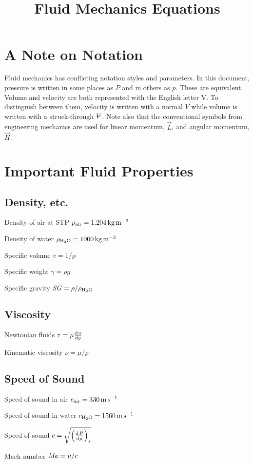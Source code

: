 \documentclass{article}
\title{Fluid Mechanics Equations}
\begin{document}


\section*{A Note on Notation}

Fluid mechanics has conflicting notation styles and parameters.  In this document, pressure is
written in some places as $P$ and in others as $p$. These are equivalent.  Volume and velocity are
both represented with the English letter V.  To distinguish between them, velocity is written with a
normal $V$ while volume is written with a struck-through $\volsym$.  Note also that the conventional
symbols from engineering mechanics are used for linear momentum, $\vec{L}$, and angular momentum,
$\vec{H}$.

\section{Important Fluid Properties}

\subsection{Density, etc.}
\begin{description*}
\item[Density of air at STP]
  \(\rho_{\mathrm{air}} = \SI{1.204}{\kilo\gram\per\cubic\meter}\)
\item[Density of water]
  \(\rho_{\mathrm{H_2O}} = \SI{1000}{\kilo\gram\per\cubic\meter}\)
\item[Specific volume]
  \(v = 1/\rho\)
\item[Specific weight]
  \(\gamma = \rho g\)
\item[Specific gravity]
  \(\mathord{\mathit{SG}} = \rho / \rho_{\mathrm{H_2O}}\)
\end{description*}

\subsection{Viscosity}
\begin{description*}
\item[Newtonian fluids]
  \(\tau = \mu \od{u}{y}\)
\item[Kinematic viscosity]
  \(\nu = \mu / \rho\)
\end{description*}

\subsection{Speed of Sound}
\begin{description*}
\item[Speed of sound in air]
  \(c_{\mathrm{air}} = \SI{330}{\meter\per\second}\)
\item[Speed of sound in water]
  \(c_{\mathrm{H_2O}} = \SI{1560}{\meter\per\second}\)
\item[Speed of sound]
  \(c = \sqrt{{\left(\od{P}{\rho}\right)}_s}\)
\item[Mach number]
  \(\mathord{\mathit{Ma}} = u/c\)
\end{description*}
\end{document}
